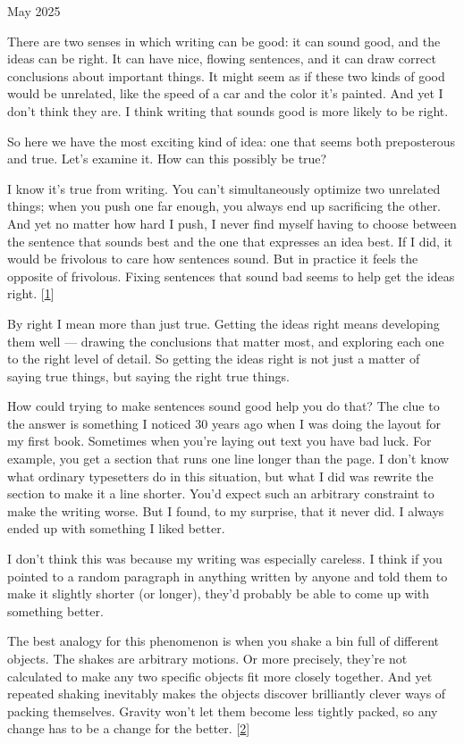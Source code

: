 May 2025

There are two senses in which writing can be good: it can sound good,
and the ideas can be right. It can have nice, flowing sentences, and it
can draw correct conclusions about important things. It might seem as if
these two kinds of good would be unrelated, like the speed of a car and
the color it's painted. And yet I don't think they are. I think writing
that sounds good is more likely to be right.

So here we have the most exciting kind of idea: one that seems both
preposterous and true. Let's examine it. How can this possibly be true?

I know it's true from writing. You can't simultaneously optimize two
unrelated things; when you push one far enough, you always end up
sacrificing the other. And yet no matter how hard I push, I never find
myself having to choose between the sentence that sounds best and the
one that expresses an idea best. If I did, it would be frivolous to care
how sentences sound. But in practice it feels the opposite of frivolous.
Fixing sentences that sound bad seems to help get the ideas right.
{[}\hyperref[f1n]{1}{]}

By right I mean more than just true. Getting the ideas right means
developing them well --- drawing the conclusions that matter most, and
exploring each one to the right level of detail. So getting the ideas
right is not just a matter of saying true things, but saying the right
true things.

How could trying to make sentences sound good help you do that? The clue
to the answer is something I noticed 30 years ago when I was doing the
layout for my first book. Sometimes when you're laying out text you have
bad luck. For example, you get a section that runs one line longer than
the page. I don't know what ordinary typesetters do in this situation,
but what I did was rewrite the section to make it a line shorter. You'd
expect such an arbitrary constraint to make the writing worse. But I
found, to my surprise, that it never did. I always ended up with
something I liked better.

I don't think this was because my writing was especially careless. I
think if you pointed to a random paragraph in anything written by anyone
and told them to make it slightly shorter (or longer), they'd probably
be able to come up with something better.

The best analogy for this phenomenon is when you shake a bin full of
different objects. The shakes are arbitrary motions. Or more precisely,
they're not calculated to make any two specific objects fit more closely
together. And yet repeated shaking inevitably makes the objects discover
brilliantly clever ways of packing themselves. Gravity won't let them
become less tightly packed, so any change has to be a change for the
better. {[}\hyperref[f2n]{2}{]}

